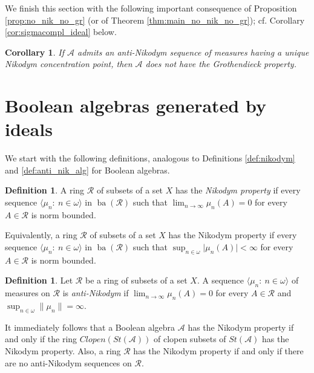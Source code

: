 \documentclass[a4paper,11pt,fleqn]{amsart}
\newtheorem{corollary}[theorem]{Corollary}
\theoremstyle{definition}
\newtheorem{definition}[theorem]{Definition}
\theoremstyle{remark}
\newtheorem{remark}[theorem]{Remark}
\numberwithin{equation}{section}
\newcommand{\N}{\mathbb{N}}
\newcommand{\aA}{\mathcal{A}}
\newcommand{\rR}{\mathcal{R}}
\DeclareMathOperator{\ba}{ba}
\newcommand{\seqn}[1]{\big\langle#1\colon\ n\io\big\rangle}
\newcommand{\io}{\in\omega}%
\begin{document}
We finish this section with the following important consequence of Proposition \ref{prop:no_nik_no_gr} (or of Theorem \ref{thm:main_no_nik_no_gr}); cf. Corollary \ref{cor:sigmacompl_ideal} below.

\begin{corollary}\label{cor:one_Ncp_gr}
    If $\aA$ admits an anti-Nikodym sequence of measures having a unique Nikodym concentration point, then $\aA$ does not have the Grothendieck property.
\end{corollary}


\section{Boolean algebras generated by ideals\label{sec:ideals}}

We start with the following definitions, analogous to Definitions \ref{def:nikodym} and \ref{def:anti_nik_alg} for Boolean algebras.

\begin{definition}\label{def:nikodym_ring}
A ring $\rR$ of subsets of a set $X$ has the \textit{Nikodym property} if every sequence $\seqn{\mu_n}$ in $\ba(\rR)$ such that $\lim_{n\to\infty}\mu_n(A)=0$ for every $A\in\rR$ is norm bounded.
\end{definition}

Equivalently, a ring $\rR$ of subsets of a set $X$ has the Nikodym property if every sequence $\seqn{\mu_n}$ in $\ba(\rR)$ such that $\sup_{n\io}\big|\mu_n(A)\big|<\infty$ for every $A\in\rR$ is norm bounded.

\begin{definition}\label{def:anti_nik_ring}
    Let $\rR$ be a ring of subsets of a set $X$. A sequence $\seqn{\mu_n}$ of measures on $\rR$ is \textit{anti-Nikodym} if $\lim_{n\to\infty}\mu_n(A)=0$ for every $A\in\rR$ and $\sup_{n\io}\|\mu_n\|=\infty$.
\end{definition}

It immediately follows that a Boolean algebra $\aA$ has the Nikodym property if and only if the ring $Clopen(St(\aA))$ of clopen subsets of $St(\aA)$ has the Nikodym property. Also, a ring $\rR$ has the Nikodym property if and only if there are no anti-Nikodym sequences on $\rR$.
\end{document}
